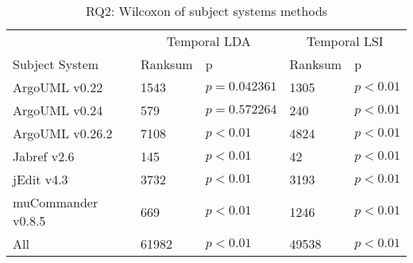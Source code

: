 \begin{table}[t]
\renewcommand{\arraystretch}{1.3}
\centering
\caption{RQ2: Wilcoxon of subject systems methods}
\begin{tabular}{l|ll|ll}
    \toprule
                        & \multicolumn{2}{c|}{Temporal LDA}      &  \multicolumn{2}{c}{Temporal LSI}  \\
    Subject System      & Ranksum & p & Ranksum & p \\
    \midrule
ArgoUML v0.22 & 1543 & $p = 0.042361$ & 1305 & $p < 0.01$ \\
ArgoUML v0.24 & 579 & $p = 0.572264$ & 240 & $p < 0.01$ \\
ArgoUML v0.26.2 & 7108 & $p < 0.01$ & 4824 & $p < 0.01$ \\
Jabref v2.6 & 145 & $p < 0.01$ & 42 & $p < 0.01$ \\
jEdit v4.3 & 3732 & $p < 0.01$ & 3193 & $p < 0.01$ \\
muCommander v0.8.5 & 669 & $p < 0.01$ & 1246 & $p < 0.01$ \\
\midrule
All & 61982 & $p < 0.01$ & 49538 & $p < 0.01$ \\
    \bottomrule
\end{tabular}
\label{table:rq2:methodstats}
\end{table}
